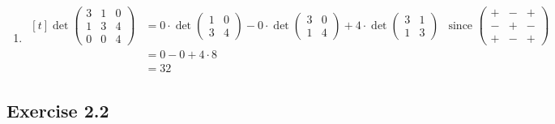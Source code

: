 \documentclass[11pt,fleqn]{book} %
\begin{document}
\begin{enumerate}
    \item 
    $\begin{aligned}[t]
        \det \begin{pmatrix} 3 & 1 & 0 \\ 1 & 3 & 4 \\ 0 & 0 & 4 \end{pmatrix} & = 0 \cdot \det \begin{pmatrix} 1 & 0 \\ 3 & 4 \end{pmatrix} - 0 \cdot \det \begin{pmatrix} 3 & 0 \\ 1 & 4 \end{pmatrix} + 4 \cdot \det \begin{pmatrix} 3 & 1 \\ 1 & 3 \end{pmatrix}
        & \text{since }\begin{pmatrix} + & - & + \\ - & + & - \\ + & - & + \end{pmatrix}             \\
                                                                               & = 0 - 0 + 4 \cdot 8 \\
                                                                               & = 32
    \end{aligned}$
\end{enumerate}

\subsection*{Exercise 2.2}
\end{document}
